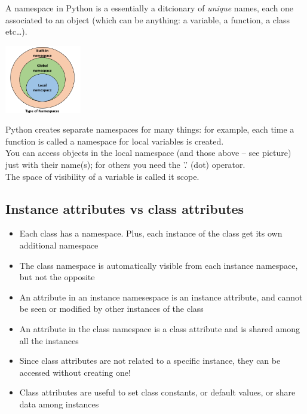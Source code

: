 A \alert{namespace} in Python is a essentially a ditcionary of \emph{unique} names, each one associated to an object (which can be anything: a variable, a function, a class etc\dots).\\
\begin{center}
\includegraphics[width=0.25\textwidth]{lez4/namespaces.png}
\end{center}



Python creates separate namespaces for many things: for example, each time a function is called a namespace for local variables is created.\\
You can access objects in the local namespace (and those above -- see picture) just with their name(s); for others you need the '.' (dot) operator.\\

The space of visibility of a variable is called it \alert{scope}.
\subsection{Instance attributes vs class attributes}

  \begin{itemize}
    \small
    \item Each class has a namespace. Plus, each instance of the class get its own additional namespace
    \medskip
    \item The class namespace is automatically visible from each instance namespace, but not the opposite
    \medskip
    \item An attribute in an instance namesespace is an \alert{instance attribute}, and cannot be seen or modified
          by other instances of the class
    \medskip
    \item An attribute in the class namespace is a \alert{class attribute} and is shared among all the instances
    \medskip
    \item Since class attributes are not related to a specific instance, they can be accessed without creating one!
    \medskip
    \item Class attributes are useful to set class constants, or default values, or share data among instances 
  \end{itemize}
  

